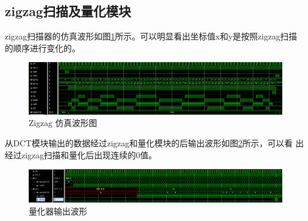 \documentclass{article}
\numberwithin {equation}{section}
\begin{document}
\begin{spacing}{1.25}
  \subsection{zigzag扫描及量化模块}
    zigzag扫描器的仿真波形如图\ref{scannerWave}所示。可以明显看出坐标值x和y是按照zigzag扫描
    的顺序进行变化的。
      \begin{figure}[H]
        \centering
        \includegraphics[scale=0.4]{./pictures/scannerWave.png}
        \caption{Zigzag 仿真波形图}
        \label{scannerWave}
      \end{figure}

    从DCT模块输出的数据经过zigzag和量化模块的后输出波形如图\ref{quantizer wave}所示，可以看
    出经过zigzag扫描和量化后出现连续的0值。
    \begin{figure}[H]
      \centering
      \includegraphics[scale=0.25]{./pictures/quantizerSim.png}
      \caption{量化器输出波形}
      \label{quantizer wave}
    \end{figure}
\newpage



\end{spacing}
\end{document}
